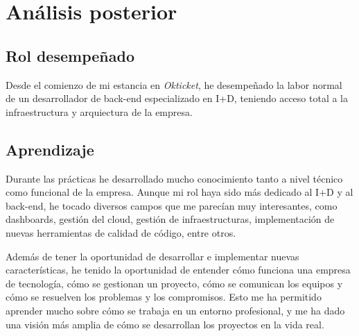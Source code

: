 \chapter{Análisis posterior}
\section{Rol desempeñado}
Desde el comienzo de mi estancia en \emph{Okticket}, he desempeñado la labor normal
de un desarrollador de back-end especializado en I+D, teniendo acceso total a la
infraestructura y arquiectura de la empresa.

\section{Aprendizaje}
Durante las prácticas he desarrollado mucho conocimiento tanto a nivel técnico como
funcional de la empresa. Aunque mi rol haya sido más dedicado al I+D y al back-end,
he tocado diversos campos que me parecían muy interesantes, como dashboards, gestión
del cloud, gestión de infraestructuras, implementación de nuevas herramientas de
calidad de código, entre otros.

Además de tener la oportunidad de desarrollar e implementar nuevas características,
he tenido la oportunidad de entender cómo funciona una empresa de tecnología, cómo
se gestionan un proyecto, cómo se comunican los equipos y cómo se resuelven los
problemas y los compromisos. Esto me ha permitido aprender mucho sobre cómo se trabaja
en un entorno profesional, y me ha dado una visión más amplia de cómo se desarrollan
los proyectos en la vida real.
